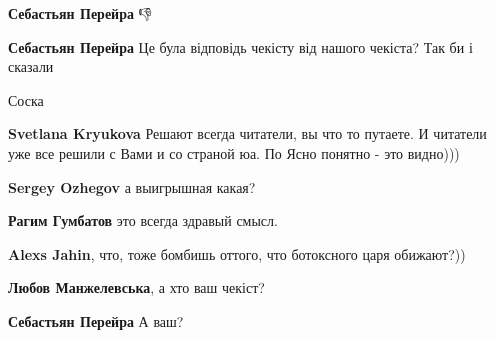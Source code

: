 \begin{itemize}
\begin{itemize}
\textbf{Себастьян Перейра} 👎

 
\textbf{Себастьян Перейра} Це була відповідь чекісту від нашого чекіста? Так би і сказали

 
Соска🤣

 
\textbf{Svetlana Kryukova} Решают всегда читатели, вы что то путаете. И читатели уже все решили с Вами и со страной юа. По Ясно понятно - это видно)))

 
\textbf{Sergey Ozhegov} а выигрышная какая?

 
\textbf{Рагим Гумбатов} это всегда здравый смысл.

 
\textbf{Alexs Jahin}, что, тоже бомбишь оттого, что ботоксного царя обижают?))

 
\textbf{Любов Манжелевська}, а хто ваш чекіст?

 
\textbf{Себастьян Перейра} А ваш?

 

\end{itemize}
\end{itemize}
